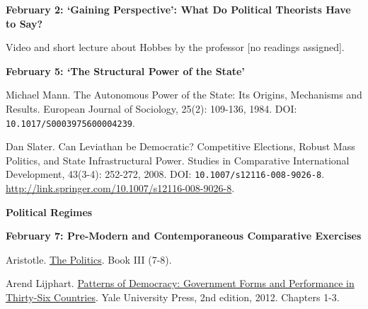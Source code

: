 \documentclass[letterpaper]{article}
\renewenvironment{itemize}{
  \begin{list}{}{
    \setlength{\leftmargin}{1.5em}
  }
}{
  \end{list}
}
\begin{document}
\begin{enumerate}
\begin{itemize}
	\item {\bf  February 2: `Gaining Perspective': What Do Political Theorists Have to Say?}
		\begin{itemize} 
			\item[$\bullet$] Video and short lecture about Hobbes by the professor [no readings assigned].
		\end{itemize}


	\item {\bf February 5: `The Structural Power of the State'}
		\begin{itemize}
			\item[$\bullet$] Michael Mann. The Autonomous Power of the State: Its Origins, Mechanisms and Results. European Journal of Sociology, 25(2): 109-136, 1984. DOI: \texttt{10.1017/S0003975600004239}.
			\item[$\bullet$] Dan Slater. Can Leviathan be Democratic? Competitive Elections, Robust Mass Politics, and State Infrastructural Power. Studies in Comparative International Development, 43(3-4): 252-272, 2008. DOI: \texttt{10.1007/s12116-008-9026-8}. \url{http://link.springer.com/10.1007/s12116-008-9026-8}.
		\end{itemize}
	\end{itemize}





\item {\bf Political Regimes}
	\begin{itemize}

		\item {\bf February 7: Pre-Modern and Contemporaneous Comparative Exercises}
			\begin{itemize}
				\item[$\bullet$] Aristotle. \href{https://socialsciences.mcmaster.ca/econ/ugcm/3ll3/aristotle/Politics.pdf}{The Politics}. Book III (7-8).
				\item[$\bullet$] Arend Lijphart. \href{https://e-edu.nbu.bg/pluginfile.php/830138/mod_resource/content/1/Lijphart%2C%20A.%20Patterns%20of%20Democracy%20-%20Government%20Forms%20and%20Performance%20in%20Thirty-Six%20Countries%20%282012%29.pdf}{Patterns of Democracy: Government Forms and Performance in Thirty-Six Countries}. Yale University Press, 2nd edition, 2012. Chapters 1-3.
			\end{itemize}
	\end{itemize}



\end{enumerate}
\end{document}
